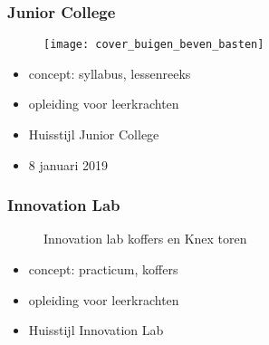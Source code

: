 \subsubsection{Junior College}

\begin{figure}[H]
	\centering	\texttt{[image: cover\_buigen\_beven\_basten]}
\end{figure}


\begin{itemize}
	\item concept: syllabus, lessenreeks  
	\item opleiding voor leerkrachten 
	\item Huisstijl Junior College	 	
	\item {}8 januari 2019	
\end{itemize}

\subsubsection{Innovation Lab}


\begin{figure}[H]
	\centering     %
	\caption{Innovation lab koffers en Knex toren}
\end{figure}




\begin{itemize}	
	\item concept: practicum, koffers
	\item opleiding voor leerkrachten 
	\item Huisstijl Innovation Lab
	
\end{itemize}

